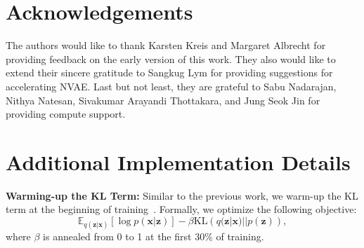 \documentclass{article}
\newcommand{\x}{{\pmb{x}}}
\newcommand{\z}{{\pmb{z}}}
\newcommand{\KL}[2]{\text{KL}\!\left(#1 || #2\right)}
\newcommand{\E}{{\mathbb{E}}}
\begin{document}
\section*{Acknowledgements}
The authors would like to thank Karsten Kreis and Margaret Albrecht for providing feedback on the early version of this work. They also would like to extend their sincere gratitude to Sangkug Lym for providing suggestions for accelerating NVAE. Last but not least, they are grateful to Sabu Nadarajan, Nithya Natesan, Sivakumar Arayandi Thottakara, and Jung Seok Jin for providing compute support.
 

{\small
}


\clearpage
\appendix
\section{Additional Implementation Details}\label{app:imp_det}

\textbf{Warming-up the KL Term:} Similar to the previous work, we warm-up the KL term at the beginning of training~\cite{sonderby2016ladder}. Formally, we optimize the following objective:
\begin{equation*}
\E_{q(\z|\x)}\left[ \log p(\x|\z) \right] - \beta \KL{q(\z|\x)}{p(\z)},
\end{equation*}
where $\beta$ is annealed from 0 to 1 at the first 30\% of training. 
\end{document}

